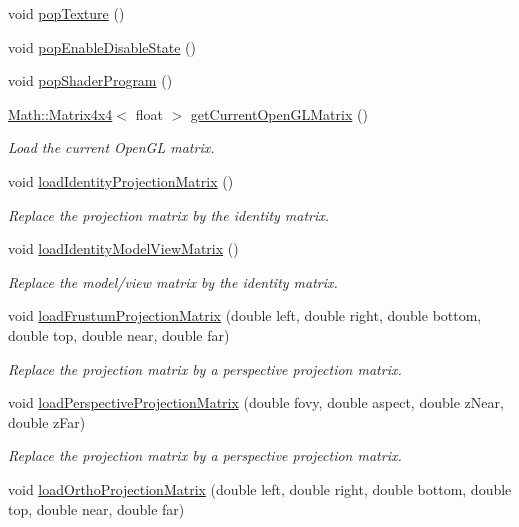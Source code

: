 \begin{DoxyCompactItemize}
\item 
void \hyperlink{namespace_utilities_a399fdac28547b4cab45f640befd6350a}{popTexture} ()
\item 
void \hyperlink{namespace_utilities_a74d082f280da485386fb80a2a65cf36a}{popEnableDisableState} ()
\item 
void \hyperlink{namespace_utilities_adbc5643c5d6336e174b6bea3a22bdb29}{popShaderProgram} ()
\item 
\hyperlink{class_math_1_1_matrix4x4}{Math::Matrix4x4}$<$ float $>$ \hyperlink{namespace_utilities_a27ecbb568ab30c335d210de98b739757}{getCurrentOpenGLMatrix} ()
\begin{DoxyCompactList}\small\item\em Load the current OpenGL matrix. \end{DoxyCompactList}\item 
void \hyperlink{namespace_utilities_af4402f472bd1945b6792f547cd498f95}{loadIdentityProjectionMatrix} ()
\begin{DoxyCompactList}\small\item\em Replace the projection matrix by the identity matrix. \end{DoxyCompactList}\item 
void \hyperlink{namespace_utilities_a80dad624c31abf68e2e44997020210a5}{loadIdentityModelViewMatrix} ()
\begin{DoxyCompactList}\small\item\em Replace the model/view matrix by the identity matrix. \end{DoxyCompactList}\item 
void \hyperlink{namespace_utilities_ad6cddf27e1b4769a998710f48a74026d}{loadFrustumProjectionMatrix} (double left, double right, double bottom, double top, double near, double far)
\begin{DoxyCompactList}\small\item\em Replace the projection matrix by a perspective projection matrix. \end{DoxyCompactList}\item 
void \hyperlink{namespace_utilities_a72a4f2b2d67dc75de5b6ebbf25248521}{loadPerspectiveProjectionMatrix} (double fovy, double aspect, double zNear, double zFar)
\begin{DoxyCompactList}\small\item\em Replace the projection matrix by a perspective projection matrix. \end{DoxyCompactList}\item 
void \hyperlink{namespace_utilities_ae239a07fe9373e6a079a8c1465cab662}{loadOrthoProjectionMatrix} (double left, double right, double bottom, double top, double near, double far)

\end{DoxyCompactItemize}
